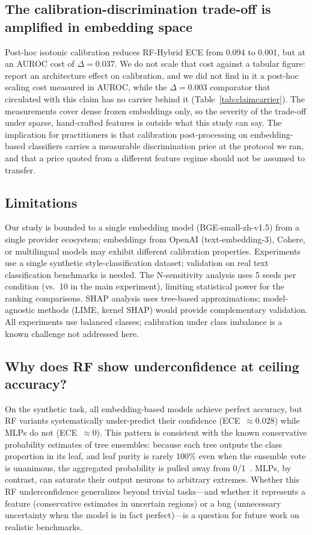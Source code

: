 \documentclass[11pt]{article}
\begin{document}
\subsection{The calibration-discrimination trade-off is amplified in embedding space}

Post-hoc isotonic calibration reduces RF-Hybrid ECE from 0.094 to 0.001, but at an AUROC cost of $\Delta{=}0.037$. We do not scale that cost against a tabular figure: \citet{wang2021revisiting} report an architecture effect on calibration, and we did not find in it a post-hoc scaling cost measured in AUROC, while the $\Delta{=}0.003$ comparator that circulated with this claim has no carrier behind it (Table~\ref{tab:claimcarrier}). The measurements cover dense frozen embeddings only, so the severity of the trade-off under sparse, hand-crafted features is outside what this study can say. The implication for practitioners is that calibration post-processing on embedding-based classifiers carries a measurable discrimination price at the protocol we ran, and that a price quoted from a different feature regime should not be assumed to transfer.

\subsection{Limitations}

Our study is bounded to a single embedding model (BGE-small-zh-v1.5) from a single provider ecosystem; embeddings from OpenAI (text-embedding-3), Cohere, or multilingual models may exhibit different calibration properties. Experiments use a single synthetic style-classification dataset; validation on real text classification benchmarks is needed. The N-sensitivity analysis uses 5 seeds per condition (vs.\ 10 in the main experiment), limiting statistical power for the ranking comparisons. SHAP analysis uses tree-based approximations; model-agnostic methods (LIME, kernel SHAP) would provide complementary validation. All experiments use balanced classes; calibration under class imbalance is a known challenge not addressed here.

\subsection{Why does RF show underconfidence at ceiling accuracy?}

On the synthetic task, all embedding-based models achieve perfect accuracy, but RF variants systematically under-predict their confidence (ECE~${\approx}0.028$) while MLPs do not (ECE~${\approx}0$). This pattern is consistent with the known conservative probability estimates of tree ensembles: because each tree outputs the class proportion in its leaf, and leaf purity is rarely 100\% even when the ensemble vote is unanimous, the aggregated probability is pulled away from 0/1~\cite{niculescu2005predicting,bostrom2008calibration}. MLPs, by contrast, can saturate their output neurons to arbitrary extremes. Whether this RF underconfidence generalizes beyond trivial tasks---and whether it represents a feature (conservative estimates in uncertain regions) or a bug (unnecessary uncertainty when the model is in fact perfect)---is a question for future work on realistic benchmarks.
\end{document}
